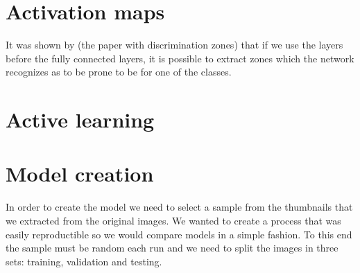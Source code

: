 \section{Activation maps}

It was shown by (the paper with discrimination zones) that if we use the layers before the fully connected layers, it is possible to extract zones which the network recognizes as to be prone to be for one of the classes.\\


\section{Active learning}


\section{Model creation}

In order to create the model we need to select a sample from the thumbnails that we extracted from the original images. We wanted to create a process that was easily reproductible so we would compare models in a simple fashion. To this end the sample must be random each run and we need to split the images in three sets: training, validation and testing.


